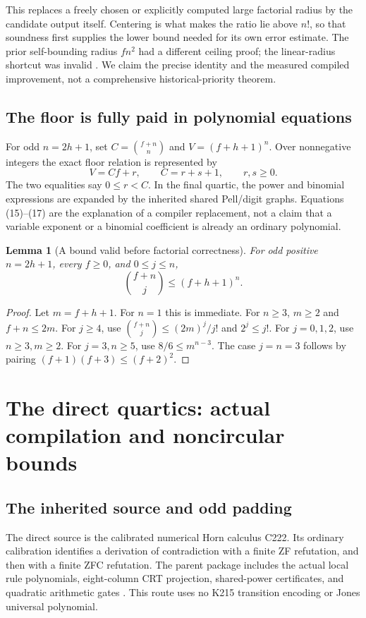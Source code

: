 \documentclass[11pt,letterpaper]{article}
\newtheorem{lemma}[theorem]{Lemma}
\theoremstyle{definition}\newtheorem{definition}[theorem]{Definition}
\theoremstyle{remark}\newtheorem{remark}[theorem]{Remark}
\begin{document}
This replaces a freely chosen or explicitly computed large factorial radius by the candidate output itself. Centering is what makes the ratio lie above $n!$, so that soundness first supplies the lower bound needed for its own error estimate. The prior self-bounding radius $fn^2$ had a different ceiling proof; the linear-radius shortcut was invalid \cite{radius}. We claim the precise identity and the measured compiled improvement, not a comprehensive historical-priority theorem.

\subsection{The floor is fully paid in polynomial equations}
For odd $n=2h+1$, set $C=\binom{f+n}{n}$ and $V=(f+h+1)^n$. Over nonnegative integers the exact floor relation is represented by
\[
 V=Cf+r,\qquad C=r+s+1,\qquad r,s\ge0.
 \tag{17}\label{eq:floorrows}
\]
The two equalities say $0\le r<C$. In the final quartic, the power and binomial expressions are expanded by the inherited shared Pell/digit graphs. Equations (15)--(17) are the explanation of a compiler replacement, not a claim that a variable exponent or a binomial coefficient is already an ordinary polynomial.

\begin{lemma}[A bound valid before factorial correctness]\label{lem:binbound}
For odd positive $n=2h+1$, every $f\ge0$, and $0\le j\le n$,
\[
 \binom{f+n}{j}\le(f+h+1)^n.
\]
\end{lemma}
\begin{proof}
Let $m=f+h+1$. For $n=1$ this is immediate. For $n\ge3$, $m\ge2$ and $f+n\le2m$. For $j\ge4$, use $\binom{f+n}{j}\le(2m)^j/j!$ and $2^j\le j!$. For $j=0,1,2$, use $n\ge3,m\ge2$. For $j=3,n\ge5$, use $8/6\le m^{n-3}$. The case $j=n=3$ follows by pairing $(f+1)(f+3)\le(f+2)^2$.
\end{proof}

\section{The direct quartics: actual compilation and noncircular bounds}
\subsection{The inherited source and odd padding}
The direct source is the calibrated numerical Horn calculus C222. Its ordinary calibration identifies a derivation of contradiction with a finite ZF refutation, and then with a finite ZFC refutation. The parent package includes the actual local rule polynomials, eight-column CRT projection, shared-power certificates, and quadratic arithmetic gates \cite{direct407}. This route uses no K215 transition encoding or Jones universal polynomial.
\end{document}

